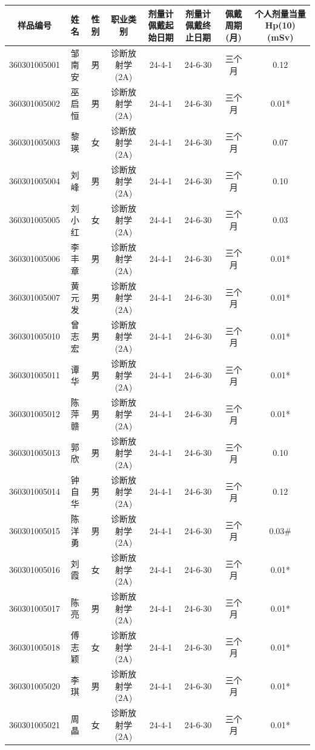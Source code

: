 \begin{table}[H]
\centering
\begin{tabular}{|c|c|c|c|c|c|c|c|}
\hline
样品编号 & 姓名 & 性别 & 职业类别 & 剂量计佩戴起始日期 & 剂量计佩戴终止日期 & 佩戴周期(月) & 个人剂量当量Hp(10)(mSv) \\
\hline
360301005001 & 邹南安 & 男 & 诊断放射学(2A) & 24-4-1 & 24-6-30 & 三个月 & 0.12 \\
\hline
360301005002 & 巫启恒 & 男 & 诊断放射学(2A) & 24-4-1 & 24-6-30 & 三个月 & 0.01* \\
\hline
360301005003 & 黎瑛 & 女 & 诊断放射学(2A) & 24-4-1 & 24-6-30 & 三个月 & 0.07 \\
\hline
360301005004 & 刘峰 & 男 & 诊断放射学(2A) & 24-4-1 & 24-6-30 & 三个月 & 0.10 \\
\hline
360301005005 & 刘小红 & 女 & 诊断放射学(2A) & 24-4-1 & 24-6-30 & 三个月 & 0.03 \\
\hline
360301005006 & 李丰章 & 男 & 诊断放射学(2A) & 24-4-1 & 24-6-30 & 三个月 & 0.01* \\
\hline
360301005007 & 黄元发 & 男 & 诊断放射学(2A) & 24-4-1 & 24-6-30 & 三个月 & 0.01* \\
\hline
360301005010 & 曾志宏 & 男 & 诊断放射学(2A) & 24-4-1 & 24-6-30 & 三个月 & 0.01* \\
\hline
360301005011 & 谭华 & 男 & 诊断放射学(2A) & 24-4-1 & 24-6-30 & 三个月 & 0.01* \\
\hline
360301005012 & 陈萍赣 & 男 & 诊断放射学(2A) & 24-4-1 & 24-6-30 & 三个月 & 0.01* \\
\hline
360301005013 & 郭欣 & 男 & 诊断放射学(2A) & 24-4-1 & 24-6-30 & 三个月 & 0.10 \\
\hline
360301005014 & 钟自华 & 男 & 诊断放射学(2A) & 24-4-1 & 24-6-30 & 三个月 & 0.12 \\
\hline
360301005015 & 陈洋勇 & 男 & 诊断放射学(2A) & 24-4-1 & 24-6-30 & 三个月 & 0.03\# \\
\hline
360301005016 & 刘霞 & 女 & 诊断放射学(2A) & 24-4-1 & 24-6-30 & 三个月 & 0.01* \\
\hline
360301005017 & 陈亮 & 男 & 诊断放射学(2A) & 24-4-1 & 24-6-30 & 三个月 & 0.01* \\
\hline
360301005018 & 傅志颖 & 女 & 诊断放射学(2A) & 24-4-1 & 24-6-30 & 三个月 & 0.01* \\
\hline
360301005020 & 李琪 & 男 & 诊断放射学(2A) & 24-4-1 & 24-6-30 & 三个月 & 0.01* \\
\hline
360301005021 & 周晶 & 女 & 诊断放射学(2A) & 24-4-1 & 24-6-30 & 三个月 & 0.01* \\

\end{tabular}
\end{table}
